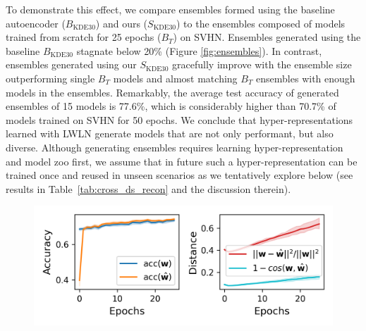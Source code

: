 \documentclass{article}
\begin{document}
To demonstrate this effect, we compare ensembles formed using the baseline autoencoder ($B_{\text{KDE}30}$) and ours ($S_{\text{KDE}30}$) to the ensembles composed of models trained from scratch for 25 epochs ($B_T$) on SVHN.
Ensembles generated using the baseline $B_{\text{KDE}30}$ stagnate below 20\% (Figure \ref{fig:ensembles}).
In contrast, ensembles generated using our $S_{\text{KDE}30}$ gracefully improve with the ensemble size outperforming single $B_T$ models and almost matching $B_T$ ensembles with enough models in the ensembles.
Remarkably, the average test accuracy of generated ensembles of 15 models is 77.6\%, which is considerably higher than 70.7\% of models trained on SVHN for 50 epochs.
We conclude that hyper-representations learned with LWLN generate models that are not only performant, but also diverse.
Although generating ensembles requires learning hyper-representation and model zoo first, we assume that in future such a hyper-representation can be trained once and reused in unseen scenarios as we tentatively explore below (see results in Table~\ref{tab:cross_ds_recon} and the discussion therein).

\begin{figure}
\vspace{-4mm}
\includegraphics[trim=4mm 2mm 3.8mm 3.8mm, clip, width=1.0\linewidth]{figures/recon_finetuning_distance_epochs.png}
\vspace{-7mm}
\vspace{-2mm}
\label{fig:new_weight_solutions}    
\end{figure}
\end{document}
